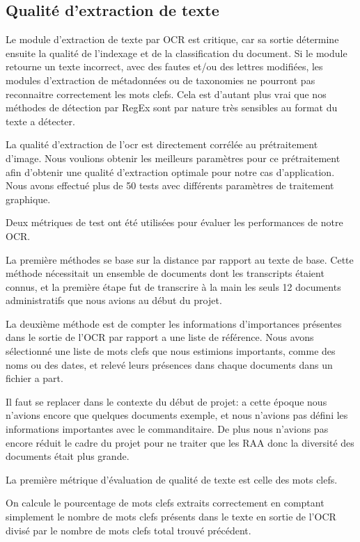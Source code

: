 \subsection{Qualité d'extraction de texte}\label{testOCR}
Le module d'extraction de texte par OCR est critique, car sa sortie détermine ensuite la qualité de l'indexage et de la classification du document.
Si le module retourne un texte incorrect, avec des fautes et/ou des lettres modifiées, les modules d'extraction de métadonnées ou de taxonomies ne pourront pas reconnaitre correctement les mots clefs.
Cela est d'autant plus vrai que nos méthodes de détection par RegEx sont par nature très sensibles au format du texte a détecter.


La qualité d'extraction de l'\gls{ocr} est directement corrélée au prétraitement d'image.
Nous voulions obtenir les meilleurs paramètres pour ce prétraitement afin d'obtenir une qualité d'extraction optimale pour notre cas d'application.
Nous avons effectué plus de 50 tests avec différents paramètres de traitement graphique.

Deux métriques de test ont été utilisées pour évaluer les performances de notre OCR\@.

La première méthodes se base sur la distance par rapport au texte de base.
Cette méthode nécessitait un ensemble de documents dont les transcripts étaient connus, et la première étape fut de transcrire à la main les seuls 12 documents administratifs que nous avions au début du projet.

La deuxième méthode est de compter les informations d'importances présentes dans le sortie de l'OCR par rapport a une liste de référence.
Nous avons sélectionné une liste de mots clefs que nous estimions importants, comme des noms ou des dates, et relevé leurs présences dans chaque documents dans un fichier a part.

Il faut se replacer dans le contexte du début de projet: a cette époque nous n'avions encore que quelques documents exemple, et nous n'avions pas défini les informations importantes avec le commanditaire.
De plus nous n'avions pas encore réduit le cadre du projet pour ne traiter que les RAA donc la diversité des documents était plus grande.



La première métrique d'évaluation de qualité de texte est celle des mots clefs.

On calcule le pourcentage de mots clefs extraits correctement en comptant simplement le nombre de mots clefs présents dans le texte en sortie de l'OCR divisé par le nombre de mots clefs total trouvé précédent. 


